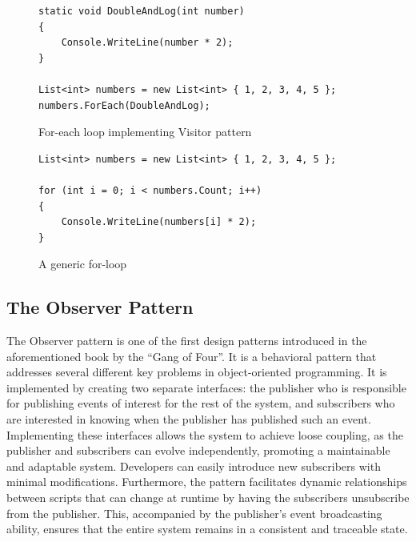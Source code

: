 \begin{figure}[ht]
    \begin{lstlisting}[style=csharp]
static void DoubleAndLog(int number)
{
    Console.WriteLine(number * 2);
}

List<int> numbers = new List<int> { 1, 2, 3, 4, 5 };
numbers.ForEach(DoubleAndLog);
    \end{lstlisting}
    \caption{For-each loop implementing Visitor pattern}
    \label{fig:visitor-pattern-example}
\end{figure}

\begin{figure}[ht]
    \begin{lstlisting}[style=csharp]
List<int> numbers = new List<int> { 1, 2, 3, 4, 5 };

for (int i = 0; i < numbers.Count; i++)
{
    Console.WriteLine(numbers[i] * 2);
}
    \end{lstlisting}
    \caption{A generic for-loop}
    \label{fig:for-loop-example}
\end{figure}

\subsection{The Observer Pattern}
The Observer pattern is one of the first design patterns introduced in the aforementioned book by the “Gang of Four”. It is a behavioral pattern that addresses several different key problems in object-oriented programming\cite{gameprogpatterns-observer}. It is implemented by creating two separate interfaces: the publisher who is responsible for publishing events of interest for the rest of the system, and subscribers who are interested in knowing when the publisher has published such an event. Implementing these interfaces allows the system to achieve loose coupling, as the publisher and subscribers can evolve independently, promoting a maintainable and adaptable system. Developers can easily introduce new subscribers with minimal modifications. Furthermore, the pattern facilitates dynamic relationships between scripts that can change at runtime by having the subscribers unsubscribe from the publisher. This, accompanied by the publisher's event broadcasting ability, ensures that the entire system remains in a consistent and traceable state. 

